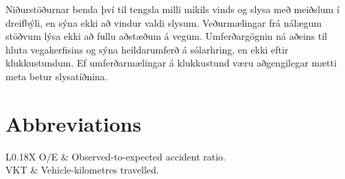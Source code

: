 \documentclass[a4paper,12pt,oneside,open=any,numbers=noenddot]{scrbook}
\begin{document}
Niðurstöðurnar benda því til tengsla milli mikils vinds og slysa með meiðslum í dreifbýli, en sýna ekki að vindur valdi slysum. Veðurmælingar frá nálægum stöðvum lýsa ekki að fullu aðstæðum á vegum. Umferðargögnin ná aðeins til hluta vegakerfisins og sýna heildarumferð á sólarhring, en ekki eftir klukkustundum. Ef umferðarmælingar á klukkustund væru aðgengilegar mætti meta betur slysatíðnina.


\newpage
{}
\hypersetup{pageanchor=true}
\tableofcontents
\listoffigures
\listoftables

\section*{Abbreviations}
\begin{tabularx}{\textwidth}{L{0.18\textwidth}X}
O/E & Observed-to-expected accident ratio. \\
VKT & Vehicle-kilometres travelled. \\
\end{tabularx}

\clearpage
{}
\setcounter{page}{1}

\end{document}
